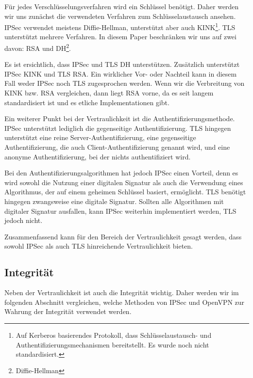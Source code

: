 \documentclass[12pt]{scrartcl}
\begin{document}
Für jedes Verschlüsselungsverfahren wird ein Schlüssel benötigt. Daher werden wir uns zunächst die verwendeten Verfahren zum Schlüsselaustausch ansehen. IPSec verwendet meistens Diffie-Hellman, unterstützt aber auch KINK\footnote{Auf Kerberos basierendes Protokoll, dass Schlüsselaustausch- und Authentifizierungsmechanismen bereitstellt. Es wurde noch nicht standardisiert\cite{Alshamsi2005}.}. TLS unterstützt mehrere Verfahren. In diesem Paper beschränken wir uns auf zwei davon: RSA und DH\footnote{Diffie-Hellman}\cite{Alshamsi2005}. %


Es ist ersichtlich, dass IPSec und TLS DH unterstützen. Zusätzlich unterstützt IPSec KINK und TLS RSA. Ein wirklicher Vor- oder Nachteil kann in diesem Fall weder IPSec noch TLS zugesprochen werden. Wenn wir die Verbreitung von KINK bzw. RSA vergleichen, dann liegt RSA vorne, da es seit langem standardisiert ist und es etliche Implementationen gibt.

Ein weiterer Punkt bei der Vertraulichkeit ist die Authentifizierungsmethode. IPSec unterstützt lediglich die gegenseitige Authentifizierung. TLS hingegen unterstützt eine reine Server-Authentifizierung, eine gegenseitige Authentifizierung, die auch Client-Authentifizierung genannt wird, und eine anonyme Authentifizierung, bei der nichts authentifiziert wird.\cite{Alshamsi2005}

Bei den Authentifizierungsalgorithmen hat jedoch IPSec einen Vorteil, denn es wird sowohl die Nutzung einer digitalen Signatur als auch die Verwendung eines Algorithmus, der auf einem geheimen Schlüssel basiert, ermöglicht. TLS benötigt hingegen zwangsweise eine digitale Signatur. Sollten alle Algorithmen mit digitaler Signatur ausfallen, kann IPSec weiterhin implementiert werden, TLS jedoch nicht.\cite{Alshamsi2005}

Zusammenfassend kann für den Bereich der Vertraulichkeit gesagt werden, dass sowohl IPSec als auch TLS hinreichende Vertraulichkeit bieten.

\subsection{Integrität}
Neben der Vertraulichkeit ist auch die Integrität wichtig. Daher werden wir im folgenden Abschnitt vergleichen, welche Methoden von IPSec und OpenVPN zur Wahrung der Integrität verwendet werden.
\end{document}
